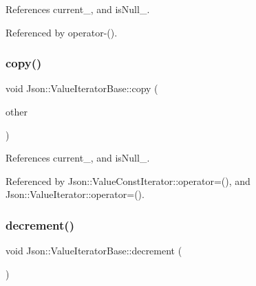 References current\+\_\+, and is\+Null\+\_\+.



Referenced by operator-\/().

\mbox{\label{classJson_1_1ValueIteratorBase_a496e6aba44808433ec5858c178be5719_a496e6aba44808433ec5858c178be5719}} 
\subsubsection{\texorpdfstring{copy()}{copy()}}
{\footnotesize\ttfamily void Json\+::\+Value\+Iterator\+Base\+::copy (\begin{DoxyParamCaption}\item[{const \hyperlink{classJson_1_1ValueIteratorBase_a9d2a940d03ea06d20d972f41a89149ee_a9d2a940d03ea06d20d972f41a89149ee}{Self\+Type} \&}]{other }\end{DoxyParamCaption})\hspace{0.3cm}{\ttfamily [protected]}}



References current\+\_\+, and is\+Null\+\_\+.



Referenced by Json\+::\+Value\+Const\+Iterator\+::operator=(), and Json\+::\+Value\+Iterator\+::operator=().

\mbox{\label{classJson_1_1ValueIteratorBase_affc8cf5ff54a9f432cc693362c153fa6_affc8cf5ff54a9f432cc693362c153fa6}} 
\subsubsection{\texorpdfstring{decrement()}{decrement()}}
{\footnotesize\ttfamily void Json\+::\+Value\+Iterator\+Base\+::decrement (\begin{DoxyParamCaption}{ }\end{DoxyParamCaption})\hspace{0.3cm}{\ttfamily [protected]}}




